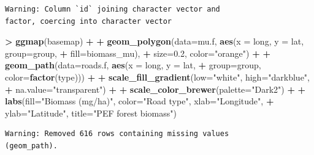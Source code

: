 \documentclass[
]{krantz}
\makeatletter
\newenvironment{Shaded}{\begin{snugshade}}{\end{snugshade}}
\newcommand{\DataTypeTok}[1]{\textcolor[rgb]{0.27,0.27,0.27}{#1}}
\newcommand{\FloatTok}[1]{\textcolor[rgb]{0.06,0.06,0.06}{#1}}
\newcommand{\KeywordTok}[1]{\textcolor[rgb]{0.27,0.27,0.27}{\textbf{#1}}}
\newcommand{\NormalTok}[1]{#1}
\newcommand{\OperatorTok}[1]{\textcolor[rgb]{0.43,0.43,0.43}{\textbf{#1}}}
\newcommand{\StringTok}[1]{\textcolor[rgb]{0.5,0.5,0.5}{#1}}
\newenvironment{kframe}{%
\medskip{}
\setlength{\fboxsep}{.8em}
 \def\at@end@of@kframe{}%
 \ifinner\ifhmode%
  \def\at@end@of@kframe{\end{minipage}}%
  \begin{minipage}{\columnwidth}%
 \fi\fi%
 \def\FrameCommand##1{\hskip\@totalleftmargin \hskip-\fboxsep
 \colorbox{shadecolor}{##1}\hskip-\fboxsep
     \hskip-\linewidth \hskip-\@totalleftmargin \hskip\columnwidth}%
 \MakeFramed {\advance\hsize-\width
   \@totalleftmargin\z@ \linewidth\hsize
   \@setminipage}}%
 {\par\unskip\endMakeFramed%
 \at@end@of@kframe}
\renewenvironment{Shaded}{\begin{kframe}}{\end{kframe}}
\makeatother
\begin{document}
\begin{verbatim}
Warning: Column `id` joining character vector and
factor, coercing into character vector
\end{verbatim}

\begin{Shaded}
\begin{Highlighting}[]
\OperatorTok{\textgreater{}}\StringTok{ }\KeywordTok{ggmap}\NormalTok{(basemap) }\OperatorTok{+}
\OperatorTok{+}\StringTok{     }\KeywordTok{geom\_polygon}\NormalTok{(}\DataTypeTok{data=}\NormalTok{mu.f, }\KeywordTok{aes}\NormalTok{(}\DataTypeTok{x =}\NormalTok{ long, }\DataTypeTok{y =}\NormalTok{ lat, }\DataTypeTok{group=}\NormalTok{group, }
\OperatorTok{+}\StringTok{                                 }\DataTypeTok{fill=}\NormalTok{biomass\_mu), }
\OperatorTok{+}\StringTok{                  }\DataTypeTok{size=}\FloatTok{0.2}\NormalTok{, }\DataTypeTok{color=}\StringTok{"orange"}\NormalTok{) }\OperatorTok{+}
\OperatorTok{+}\StringTok{     }\KeywordTok{geom\_path}\NormalTok{(}\DataTypeTok{data=}\NormalTok{roads.f, }\KeywordTok{aes}\NormalTok{(}\DataTypeTok{x =}\NormalTok{ long, }\DataTypeTok{y =}\NormalTok{ lat, }
\OperatorTok{+}\StringTok{                                 }\DataTypeTok{group=}\NormalTok{group, }\DataTypeTok{color=}\KeywordTok{factor}\NormalTok{(type))) }\OperatorTok{+}
\OperatorTok{+}\StringTok{     }\KeywordTok{scale\_fill\_gradient}\NormalTok{(}\DataTypeTok{low=}\StringTok{"white"}\NormalTok{, }\DataTypeTok{high=}\StringTok{"darkblue"}\NormalTok{, }
\OperatorTok{+}\StringTok{                         }\DataTypeTok{na.value=}\StringTok{"transparent"}\NormalTok{) }\OperatorTok{+}
\OperatorTok{+}\StringTok{     }\KeywordTok{scale\_color\_brewer}\NormalTok{(}\DataTypeTok{palette=}\StringTok{"Dark2"}\NormalTok{) }\OperatorTok{+}
\OperatorTok{+}\StringTok{     }\KeywordTok{labs}\NormalTok{(}\DataTypeTok{fill=}\StringTok{"Biomass (mg/ha)"}\NormalTok{, }\DataTypeTok{color=}\StringTok{"Road type"}\NormalTok{, }\DataTypeTok{xlab=}\StringTok{"Longitude"}\NormalTok{, }
\OperatorTok{+}\StringTok{          }\DataTypeTok{ylab=}\StringTok{"Latitude"}\NormalTok{, }\DataTypeTok{title=}\StringTok{"PEF forest biomass"}\NormalTok{)}
\end{Highlighting}
\end{Shaded}

\begin{verbatim}
Warning: Removed 616 rows containing missing values
(geom_path).
\end{verbatim}
\end{document}
